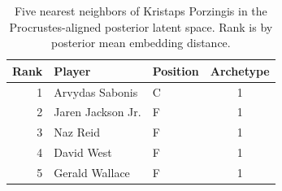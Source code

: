 \begin{table}[htbp]
  \centering\small
  \begin{tabular}{rllc}
    \toprule
    Rank & Player & Position & Archetype \\
    \midrule
    1 & Arvydas Sabonis & C & 1 \\
    2 & Jaren Jackson Jr. & F & 1 \\
    3 & Naz Reid & F & 1 \\
    4 & David West & F & 1 \\
    5 & Gerald Wallace & F & 1 \\
    \bottomrule
  \end{tabular}
  \caption{Five nearest neighbors of Kristaps Porzingis in the Procrustes-aligned posterior latent space. Rank is by posterior mean embedding distance.}
  \label{tab:Kristaps_Porzingis_neighbors}
\end{table}

